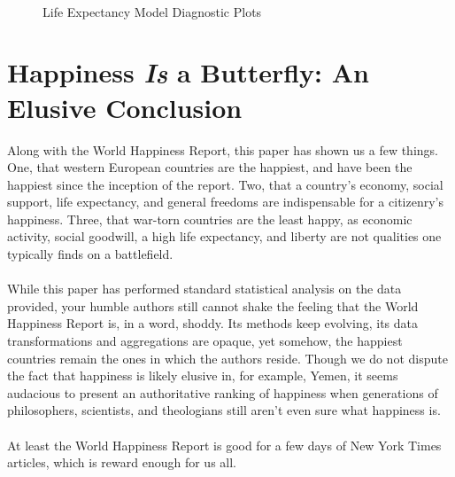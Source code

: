 \documentclass{article}
\begin{document}
\begin{figure}[h]
    \centering
    \\
    \caption{Life Expectancy Model Diagnostic Plots}
    \label{simp_resids}
\end{figure}

\section{Happiness \textit{Is} a Butterfly: An Elusive Conclusion}
Along with the World Happiness Report, this paper has shown us a few things. One, that western European countries are the happiest, and have been the happiest since the inception of the report. Two, that a country's economy, social support, life expectancy, and general freedoms are indispensable for a citizenry's happiness. Three, that war-torn countries are the least happy, as economic activity, social goodwill, a high life expectancy, and liberty are not qualities one typically finds on a battlefield. \\\\
While this paper has performed standard statistical analysis on the data provided, your humble authors still cannot shake the feeling that the World Happiness Report is, in a word, shoddy. Its methods keep evolving, its data transformations and aggregations are opaque, yet somehow, the happiest countries remain the ones in which the authors reside. Though we do not dispute the fact that happiness is likely elusive in, for example, Yemen, it seems audacious to present an authoritative ranking of happiness when generations of philosophers, scientists, and theologians still aren't even sure what happiness is. \\\\
At least the World Happiness Report is good for a few days of New York Times articles, which is reward enough for us all.
\end{document}
